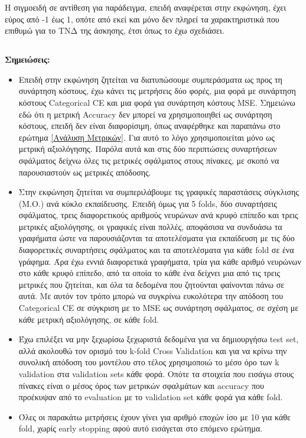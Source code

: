 \documentclass[12pt,a4paper]{article}
\begin{document}
Η σιγμοειδή σε αντίθεση για παράδειγμα, επειδή αναφέρεται στην εκφώνηση, έχει εύρος από -1 έως 1, οπότε από εκεί και μόνο δεν πληρεί τα χαρακτηριστικά που επιθυμώ για το ΤΝΔ της άσκησης, έτσι όπως το έχω σχεδιάσει.

\subsection{}
\textbf{Σημειώσεις:} 
\begin{itemize}
    \item Επειδή στην εκφώνηση ζητείται να διατυπώσουμε συμπεράσματα ως προς τη συνάρτηση κόστους, έχω κάνει τις μετρήσεις δύο φορές, μια φορά με συνάρτηση κόστους Categorical CE και μια φορά για συνάρτηση κόστους MSE. Σημειώνω εδώ ότι η μετρική Accuracy δεν μπορεί να χρησιμοποιηθεί ως συνάρτηση κόστους, επειδή δεν είναι διαφορίσιμη, όπως αναφέρθηκε και παραπάνω στο ερώτημα \ref{Ανάλυση Μετρικών}. Για αυτό το λόγο χρησιμοποιείται μόνο ως μετρική αξιολόγησης. Παρόλα αυτά και στις δύο περιπτώσεις συναρτήσεων σφάλματος δείχνω όλες τις μετρικές σφάλματος στους πίνακες, με σκοπό να παρουσιαστούν ως μετρικές απόδοσης.
    \item Στην εκφώνηση ζητείται να συμπεριλάβουμε τις γραφικές παραστάσεις σύγκλισης (Μ.Ο.) ανά κύκλο εκπαίδευσης. Επειδή όμως για 5 folds, δύο συναρτήσεις σφάλματος, τρεις διαφορετικούς αριθμούς νευρώνων ανά κρυφό επίπεδο και τρεις μετρικές αξιολόγησης, οι γραφικές είναι πολλές, αποφάσισα να συνδυάσω τα γραφήματα ώστε να παρουσιάζονται τα αποτελέσματα για εκπαίδευση με τις δύο διαφορετικές συναρτήσεις σφάλματος και τα αποτελέσματα για κάθε fold σε ένα γράφημα. Άρα έχω εννιά διαφορετικά γραφήματα, τρία για κάθε αριθμό νευρώνων στο κάθε κρυφό επίπεδο, από τα οποία το κάθε ένα δείχνει μια από τις τρεις μετρικές που ζητείται, και όλα τα δεδομένα που ζητούνται φαίνονται πάνω σε αυτά. Με αυτόν τον τρόπο μπορώ να συγκρίνω ευκολότερα την απόδοση του Categorical CE σε σύγκριση με το MSE ως συνάρτηση σφάλματος, σε σχέση με κάθε μετρική αξιολόγησης, σε κάθε fold.
    \item Έχω επιλέξει να μην ξεχωρίσω ξεχωριστά δεδομένα για να δημιουργήσω test set, αλλά ακολουθώ τον ορισμό του k-fold Cross Validation και για να κρίνω την συνολική απόδοση του μοντέλου στο τέλος χρησιμοποιώ το μέσο όρο των k validation στα validation sets κάθε φορά. Οπότε τα στοιχεία που εισάγω στους πίνακες είναι ο μέσος όρος των μετρικών σφαλμάτων και accuracy που προέκυψαν από το evaluation με το validation set κάθε φορά για κάθε fold.
    \item Όλες οι παρακάτω μετρήσεις έχουν γίνει για αριθμό εποχών ίσο με 10 για κάθε fold, χωρίς early stopping αφού αυτό εισάγεται στο επόμενο ερώτημα.
\end{itemize}
\end{document}
